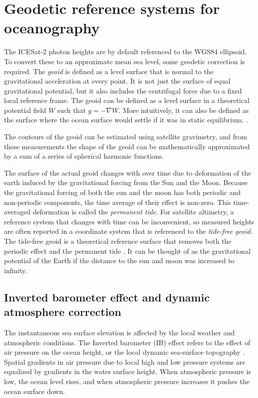 \section{Geodetic reference systems for oceanography}

The ICESat-2 photon heights are by default referenced to the WGS84 ellipsoid. To convert these to an approximate mean sea level, some geodetic correction is required. The \emph{geoid} is defined as a level surface that is normal to the gravitational acceleration at every point. It is not just the surface of equal gravitational potential, but it also includes the centrifugal force due to a fixed local reference frame. The geoid can be defined as a level surface in a theoretical potential field $W$ such that $g= - \nabla W$. More intuitively, it can also be defined as the surface where the ocean surface would settle if it was in static equilibrium. \parencite{Hughes2008}.

The contours of the geoid can be estimated using satellite gravimetry, and from these measurements the shape of the geoid can be mathematically approximated by a sum of a series of spherical harmonic functions.

The surface of the actual geoid changes with over time due to deformation of the earth induced by the gravitational forcing from the Sun and the Moon. Because the gravitational forcing of both the sun and the moon has both periodic and non-periodic components, the time average of their effect is non-zero. This time-averaged deformation is called the \emph{permanent tide}. For satellite altimetry, a reference system that changes with time can be inconvenient, so measured heights are often reported in a coordinate system that is referenced to the \emph{tide-free geoid}. The tide-free geoid is a theoretical reference surface that removes both the periodic effect and the permanent tide \parencite{Makinen2009}. It can be thought of as the gravitational potential of the Earth if the distance to the sun and moon was increased to infinity.

\subsection{Inverted barometer effect and dynamic atmosphere correction}

The instantaneous sea surface elevation is affected by the local weather and atmospheric conditions. The Inverted barometer (IB) effect refers to the effect of air pressure on the ocean height, or the  local dynamic sea-surface topography \parencite{Robbins2022}. Spatial gradients in air pressure due to local high and low pressure systems are equalized by gradients in the water surface height. When atmospheric pressure is low, the ocean level rises, and when atmospheric pressure increases it pushes the ocean surface down.

